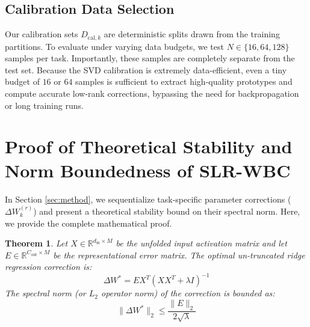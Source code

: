 \documentclass{article}
\theoremstyle{plain}
\newtheorem{theorem}{Theorem}[section]
\theoremstyle{definition}
\theoremstyle{remark}
\begin{document}
\subsection{Calibration Data Selection}
Our calibration sets $D_{\text{cal}, k}$ are deterministic splits drawn from the training partitions. To evaluate under varying data budgets, we test $N \in \{16, 64, 128\}$ samples per task. Importantly, these samples are completely separate from the test set. Because the SVD calibration is extremely data-efficient, even a tiny budget of $16$ or $64$ samples is sufficient to extract high-quality prototypes and compute accurate low-rank corrections, bypassing the need for backpropagation or long training runs.

\section{Proof of Theoretical Stability and Norm Boundedness of SLR-WBC}
\label{app:stability_proof}
In Section \ref{sec:method}, we sequentialize task-specific parameter corrections ($\Delta W_k^{(r)}$) and present a theoretical stability bound on their spectral norm. Here, we provide the complete mathematical proof.

\begin{theorem}
Let $X \in \mathbb{R}^{d_{\text{in}} \times M}$ be the unfolded input activation matrix and let $E \in \mathbb{R}^{C_{\text{out}} \times M}$ be the representational error matrix. The optimal un-truncated ridge regression correction is:
\begin{equation}
    \Delta W^* = E X^T (X X^T + \lambda I)^{-1}
\end{equation}
The spectral norm (or $L_2$ operator norm) of the correction is bounded as:
\begin{equation}
    \|\Delta W^*\|_2 \le \frac{\|E\|_2}{2\sqrt{\lambda}}
\end{equation}
\end{theorem}
\end{document}
